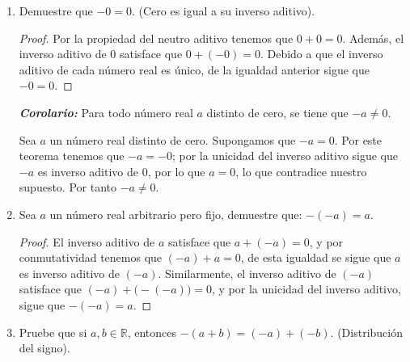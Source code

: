 \documentclass[11pt]{article}
\newcommand{\R}{\mathbb{R}}
\begin{document}
\begin{enumerate}[label=\alph*)]
    \item Demuestre que $-0 = 0$. (Cero es igual a su inverso aditivo).
    \vspace{-1em}\begin{proof} 
        Por la propiedad del neutro aditivo tenemos que $0+0=0$. Además, el inverso aditivo de $0$ satisface que $0 + (-0) = 0$. Debido a que el inverso aditivo de cada número real es único, de la igualdad anterior sigue que $-0 = 0$. \qedhere    
    \end{proof} \vspace{-1em}

    \textbf{\textit{Corolario:}} Para todo número real $a$ distinto de cero, se tiene que $-a\neq 0$.

    Sea $a$ un número real distinto de cero. Supongamos que $-a=0$. Por este teorema tenemos que $-a=-0$; por la unicidad del inverso aditivo sigue que $-a$ es inverso aditivo de $0$, por lo que $a=0$, lo que contradice nuestro supuesto. Por tanto $-a\neq 0$.

    \item Sea $a$ un número real arbitrario pero fijo, demuestre que: $-(-a)=a$.
        
    \vspace{-1em}\begin{proof} 
        El inverso aditivo de $a$ satisface que $a + (-a) = 0$, y por conmutatividad tenemos que $(-a) + a = 0$, de esta igualdad se sigue que $a$ es inverso aditivo de $(-a)$. Similarmente, el inverso aditivo de $(-a)$ satisface que $(-a) + \bigl(-(-a)\bigr) = 0$, y por la unicidad del inverso aditivo, sigue que $-(-a) = a$. \qedhere    
    \end{proof} \vspace{-1em}

    \item Pruebe que si $a,b\in \R$, entonces $-(a+b)=(-a)+(-b)$. (Distribución del signo).


\end{enumerate}
\end{document}
